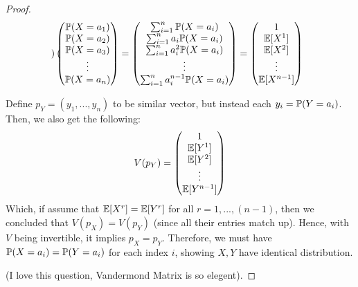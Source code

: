 \documentclass{article}
\begin{document}
\begin{proof}
\begin{align}
\begin{pmatrix}
        \end{pmatrix}\begin{pmatrix}
            \mathbb{P}(X=a_1)\\\mathbb{P}(X=a_2)\\\mathbb{P}(X=a_3)\\\vdots \\\mathbb{P}(X=a_n)
        \end{pmatrix} = \begin{pmatrix}
            \sum_{i=1}^{n}\mathbb{P}(X=a_i)\\\sum_{i=1}^{n}a_i\mathbb{P}(X=a_i)\\\sum_{i=1}^{n}a_i^2\mathbb{P}(X=a_i)\\\vdots\\\sum_{i=1}^{n}a_i^{n-1}\mathbb{P}(X=a_i)
        \end{pmatrix} = \begin{pmatrix}
            1\\\mathbb{E}[X^1]\\\mathbb{E}[X^2]\\\vdots \\\mathbb{E}[X^{n-1}]
        \end{pmatrix}
    \end{align}

    Define $p_Y=(y_1,...,y_n)$ to be similar vector, but instead each $y_i=\mathbb{P}(Y=a_i)$. Then, we also get the following:
    \begin{align}
        V(p_Y)= \begin{pmatrix}
            1\\\mathbb{E}[Y^1]\\\mathbb{E}[Y^2]\\\vdots \\\mathbb{E}[Y^{n-1}]
        \end{pmatrix}
    \end{align}
    Which, if assume that $\mathbb{E}[X^r]=\mathbb{E}[Y^r]$ for all $r=1,...,(n-1)$, then we concluded that $V(p_X)=V(p_Y)$ (since all their entries match up). Hence, with $V$ being invertible, it implies $p_X=p_Y$. Therefore, we must have $\mathbb{P}(X=a_i)=\mathbb{P}(Y=a_i)$ for each index $i$, showing $X,Y$ have identical distribution. 

    (I love this question, Vandermond Matrix is so elegent).
\end{proof}

\newpage
\end{document}
